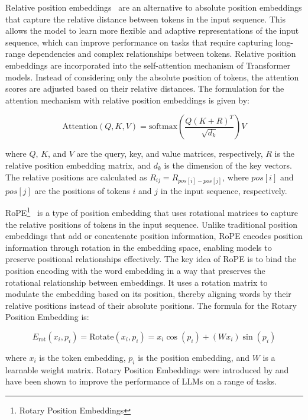 Relative position embeddings~\cite{shaw2018self} are an alternative to absolute position embeddings that capture the relative distance between tokens in the input sequence.
This allows the model to learn more flexible and adaptive representations of the input sequence, which can improve performance on tasks that require capturing long-range dependencies and complex relationships between tokens.
Relative position embeddings are incorporated into the self-attention mechanism of Transformer models.
Instead of considering only the absolute position of tokens, the attention scores are adjusted based on their relative distances.
The formulation for the attention mechanism with relative position embeddings is given by:

\begin{equation}
	\text{Attention}(Q, K, V) = \text{softmax}\left(\frac{Q(K+R)^T}{\sqrt{d_k}}\right)V
	\label{eq:relative-position-embeddings}
\end{equation}

\noindent where \(Q\), \(K\), and \(V\) are the query, key, and value matrices, respectively, \(R\) is the relative position embedding matrix, and \(d_k\) is the dimension of the key vectors.
The relative positions are calculated as \(R_{ij} = R_{pos[i]-pos[j]}\), where \(pos[i]\) and \(pos[j]\) are the positions of tokens \(i\) and \(j\) in the input sequence, respectively.

RoPE\footnote{Rotary Position Embeddings}~\cite{su2021roformer} is a type of position embedding that uses rotational matrices to capture the relative positions of tokens in the input sequence.
Unlike traditional position embeddings that add or concatenate position information, RoPE encodes position information through rotation in the embedding space, enabling models to preserve positional relationships effectively.
The key idea of RoPE is to bind the position encoding with the word embedding in a way that preserves the rotational relationship between embeddings.
It uses a rotation matrix to modulate the embedding based on its position, thereby aligning words by their relative positions instead of their absolute positions.
The formula for the Rotary Position Embedding is:

\begin{equation}
	E_{\text{rot}}(x_i,p_i) = \text{Rotate}(x_i,p_i) = x_i\cos(p_i) + (Wx_i)\sin(p_i)
	\label{eq:rope}
\end{equation}

\noindent where \(x_i\) is the token embedding, \(p_i\) is the position embedding, and \(W\) is a learnable weight matrix.
Rotary Position Embeddings were introduced by \textcite{su2021roformer} and have been shown to improve the performance of LLMs on a range of tasks.

